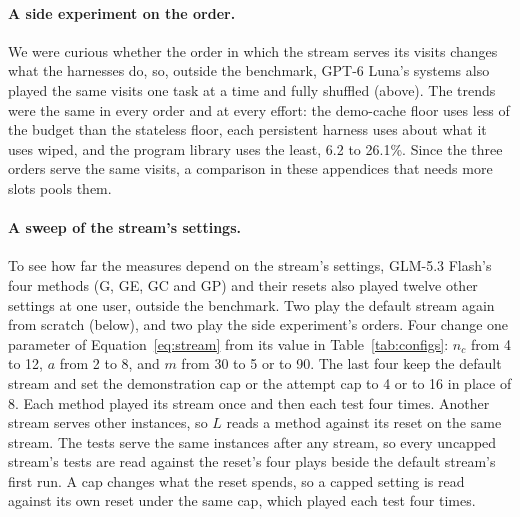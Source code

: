 \paragraph{A side experiment on the order.}\label{app:orders}
We were curious whether the order in which the stream serves its visits changes what the harnesses do, so, outside the benchmark, GPT-6 Luna's systems also played the same visits one task at a time and fully shuffled (above). The trends were the same in every order and at every effort: the demo-cache floor uses less of the budget than the stateless floor, each persistent harness uses about what it uses wiped, and the program library uses the least, 6.2 to 26.1\%. Since the three orders serve the same visits, a comparison in these appendices that needs more slots pools them.

\paragraph{A sweep of the stream's settings.}\label{app:sweep}
To see how far the measures depend on the stream's settings, GLM-5.3 Flash's four methods (G, GE, GC and GP) and their resets also played twelve other settings at one user, outside the benchmark. Two play the default stream again from scratch (below), and two play the side experiment's orders. Four change one parameter of Equation~\ref{eq:stream} from its value in Table~\ref{tab:configs}: $n_c$ from 4 to 12, $a$ from 2 to 8, and $m$ from 30 to 5 or to 90. The last four keep the default stream and set the demonstration cap or the attempt cap to 4 or to 16 in place of 8. Each method played its stream once and then each test four times. Another stream serves other instances, so $L$ reads a method against its reset on the same stream. The tests serve the same instances after any stream, so every uncapped stream's tests are read against the reset's four plays beside the default stream's first run. A cap changes what the reset spends, so a capped setting is read against its own reset under the same cap, which played each test four times.

